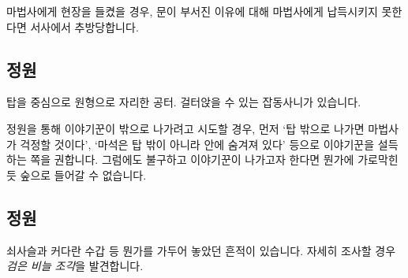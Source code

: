 \documentclass{report}
\begin{document}
		마법사에게 현장을 들켰을 경우, 문이 부서진 이유에 대해 마법사에게 납득시키지 못한다면 서사에서 추방당합니다.
	
	\subsection*{정원}
		탑을 중심으로 원형으로 자리한 공터. 걸터앉을 수 있는 잡동사니가 있습니다.
		
		정원을 통해 이야기꾼이 밖으로 나가려고 시도할 경우, 먼저 `탑 밖으로 나가면 마법사가 걱정할 것이다', `마석은 탑 밖이 아니라 안에 숨겨져 있다' 등으로 이야기꾼을 설득하는 쪽을 권합니다. 그럼에도 불구하고 이야기꾼이 나가고자 한다면 뭔가에 가로막힌 듯 숲으로 들어갈 수 없습니다.
	
	\subsection*{정원}
		쇠사슬과 커다란 수갑 등 뭔가를 가두어 놓았던 흔적이 있습니다. 자세히 조사할 경우 \emph{검은 비늘 조각}을 발견합니다.
	
\end{document}
